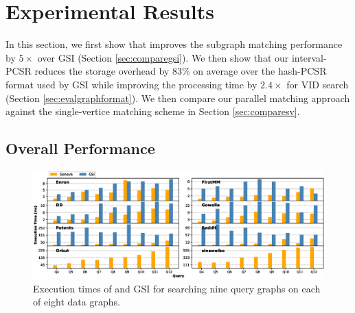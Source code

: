 \section{Experimental Results}
In this section, we first show that \SystemName improves the subgraph matching performance by $5\times$ over GSI (Section \ref{sec:comparegsi}). We
then show that our interval-PCSR reduces the storage overhead by 83\% on average over the hash-PCSR format used by GSI while improving the
processing time by $2.4\times$ for VID search (Section \ref{sec:evalgraphformat}). We then compare our parallel matching approach against the
single-vertice matching scheme in Section \ref{sec:comparesv}.


\subsection{Overall Performance\label{sec:comparegsi}}
\begin{figure}
\centering
\includegraphics[width=\textwidth]{./figure/overperformance.eps}
\caption{Execution times of \SystemName and GSI for searching nine query graphs on each of eight data graphs.}	
\label{fig:overallperf}
\end{figure}

